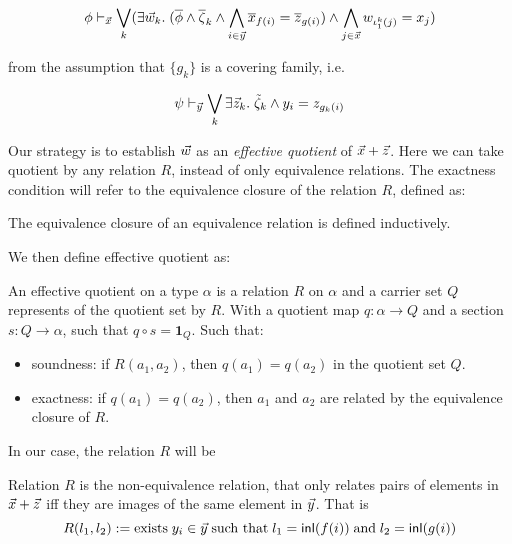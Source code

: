\begin{equation}
\phi \vdash_{\vec{x}} \bigvee_k (\exists\vec{w}_k.\;(\overline{\phi}\land \overline{\zeta}_k \land\bigwedge_{i\in \vec{y}} \overline{x}_{f(i)} = \overline{z}_{g(i)}) \land \bigwedge_{j\in\vec{x}}w_{{\iota^k_1(j)}} = x_j )
\end{equation}

from the assumption that $\{g_k\}$ is a covering family, i.e.

\[\psi\vdash_{\vec{y}} \bigvee_k \exists \vec{z}_k.\; \tilde{\zeta}_k\land y_i = z_{g_k(i)}\]

  
Our strategy is to establish $\vec{w}$ as an \emph{effective quotient} of $\vec{x}+ \vec{z}$. 
Here we can take quotient by any relation $R$, instead of only equivalence relations. 
The exactness condition will refer to the equivalence closure of the relation $R$, defined as:

\begin{definition}
  The equivalence closure of an equivalence relation is defined inductively.
  \leanok
\end{definition}

We then define effective quotient as:

\begin{definition}
  \leanok
  An effective quotient on a type $\alpha$ is a relation $R$ on $\alpha$ and a carrier set $Q$ represents of the quotient
  set by $R$. With a quotient map $q:\alpha\to Q$ and a section $s:Q\to \alpha$, such that $q\circ s = \mathbf{1}_Q$. Such that:
  \begin{itemize}
    \item soundness: if $R(a_1,a_2)$, then $q(a_1) = q(a_2)$ in the quotient set $Q$.
    \item exactness: if $q(a_1) = q(a_2)$, then $a_1$ and $a_2$ are related by the equivalence closure of $R$.
  \end{itemize}

\end{definition}

In our case, the relation $R$ will be 



\begin{definition}[Relation defined by the equalities in $f(i) = g(i)$]
  Relation $R$ is the non-equivalence relation, that only relates pairs of elements in $\vec{x}+\vec{z}$ 
  iff they are images of the same element in $\vec{y}$. That is 
  \begin{equation}
    R(l_1,l_2):= \text{exists}\; y_i \in \vec{y} \;\text{such that}\; l_1 = \mathsf{inl}(f(i))\; \text{and}\;  l_2 = \mathsf{inl}(g(i))
  \end{equation}
\end{definition}

